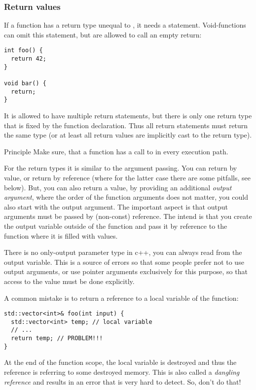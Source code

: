 \subsubsection{Return values}
If a function has a return type unequal to , it needs a  statement. Void-functions can omit this statement, but are allowed to
call an empty return:
\begin{verbatim}
int foo() {
  return 42;
}

void bar() {
  return;
}
\end{verbatim}

It is allowed to have multiple return statements, but there is only one return type that is fixed by the function declaration. Thus all return statements
must return the same type (or at least all return values are implicitly cast to the return type).

\begin{guideline}{Principle}
  Make sure, that a function has a call to  in every execution path.
\end{guideline}

For the return types it is similar to the argument passing. You can return by value, or return by reference (where for the latter case there
are some pitfalls, see below). But, you can also return a value, by providing an additional \emph{output argument}, \eg
%
%
where the order of the function arguments does not matter, \ie you could also start with the output argument. The important aspect is that
output arguments must be passed by (non-const) reference. The intend is that you create the output variable outside of the function and pass it by
reference to the function where it is filled with values.

\begin{rem}
  There is no only-output parameter type in c++, you can always read from the output variable. This is a source of errors so that some people prefer
  not to use output arguments, or use pointer arguments exclusively for this purpose, so that access to the value must be done explicitly.
\end{rem}

A common mistake is to return a reference to a local variable of the function:
\begin{verbatim}
std::vector<int>& foo(int input) {
  std::vector<int> temp; // local variable
  // ...
  return temp; // PROBLEM!!!
}
\end{verbatim}
At the end of the function scope, the local variable is destroyed and thus the reference is referring to some destroyed memory. This is also
called a \emph{dangling reference} and results in an error that is very hard to detect. So, don't do that!

